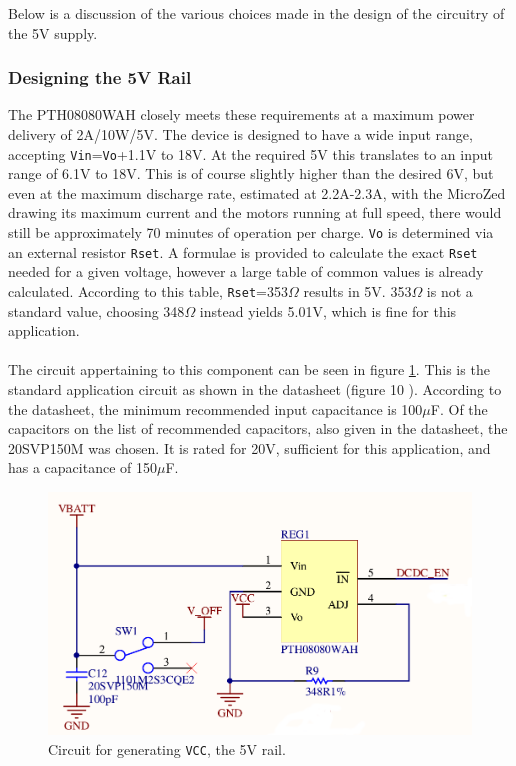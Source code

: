 Below is a discussion of the various choices made in the design of the circuitry of the 5V supply.

\subsubsection*{Designing the 5V Rail}
The PTH08080WAH \cite{pth08080} closely meets these requirements at a maximum power delivery of 2A/10W/5V.
The device is designed to have a wide input range, accepting \texttt{Vin}=\texttt{Vo}+1.1V to 18V.
At the required 5V this translates to an input range of 6.1V to 18V.
This is of course slightly higher than the desired 6V, but even at the maximum discharge rate, estimated at 2.2A-2.3A, with the MicroZed drawing its maximum current and the motors running at full speed, there would still be approximately 70 minutes of operation per charge.
\texttt{Vo} is determined via an external resistor \texttt{Rset}.
A formulae is provided to calculate the exact \texttt{Rset} needed for a given voltage, however a large table of common values is already calculated.
According to this table, \texttt{Rset}=353$\Omega$ results in 5V.
353$\Omega$ is not a standard value, choosing 348$\Omega$ instead yields 5.01V, which is fine for this application.
\\~\\
The circuit appertaining to this component can be seen in figure \ref{fig:pth08080}.
This is the standard application circuit as shown in the datasheet (figure 10 \cite{pth08080}).
According to the datasheet, the minimum recommended input capacitance is 100$\mu$F. 
Of the capacitors on the list of recommended capacitors, also given in the datasheet, the 20SVP150M was chosen.
It is rated for 20V, sufficient for this application, and has a capacitance of 150$\mu$F. 
\begin{figure}[h]
	\centering
	\includegraphics[width=0.6\linewidth]{graphics/5v.png}
	\caption{Circuit for generating \texttt{VCC}, the 5V rail.}
	\label{fig:pth08080}
\end{figure}

